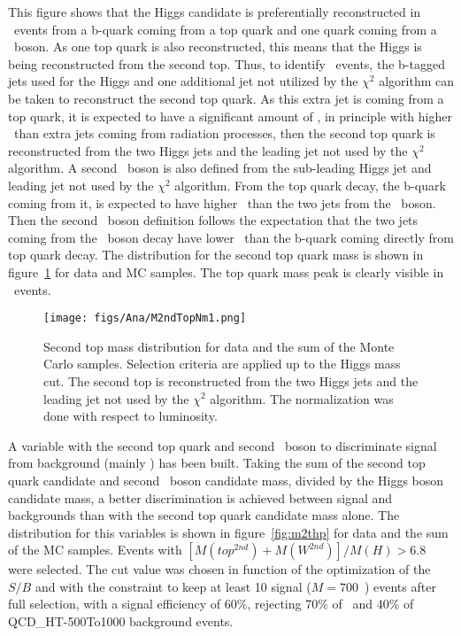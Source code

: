 This figure shows that the Higgs candidate is preferentially reconstructed in \ttbar~events from a b-quark coming from a top quark and one quark coming from a \W~boson. As one top quark is also reconstructed, this means that the Higgs is being reconstructed from the second top. Thus, to identify \ttbar~events, the b-tagged jets used for the Higgs and one additional jet not utilized by the $\chi^{2}$ algorithm can be taken to reconstruct the second top quark. As this extra jet is coming from a top quark, it is expected to have a significant amount of \pt, in principle with higher \pt~than extra jets coming from radiation processes, then the second top quark is reconstructed from the two Higgs jets and the leading jet not used by the $\chi^{2}$ algorithm. A second \W~boson is also defined from the sub-leading Higgs jet and leading jet not used by the $\chi^{2}$ algorithm. From the top quark decay, the b-quark coming from it, is expected to have higher \pt~than the two jets from the \W~boson. Then the second \W~boson definition follows the expectation that the two jets coming from the \W~boson decay have lower \pt~than the b-quark coming directly from top quark decay. The distribution for the second top quark mass is shown in figure~\ref{fig:2ndTM} for data and MC samples. The top quark mass peak is clearly visible in \ttbar~events.

\begin{figure}[!Hhtbp]
  \begin{center}
    \texttt{[image: figs/Ana/M2ndTopNm1.png]}
    \caption{Second top mass distribution for data and the sum of the Monte Carlo samples. Selection criteria are applied up to the Higgs mass cut. The second top is reconstructed from the two Higgs jets and the leading jet not used by the $\chi^{2}$ algorithm. The normalization was done with respect to luminosity.}
    \label{fig:2ndTM}
  \end{center}
\end{figure}

A variable with the second top quark and second \W~boson to discriminate signal from background (mainly \ttbar) has been built. Taking the sum of the second top quark candidate and second \W~boson candidate mass, divided by the Higgs boson candidate mass, a better discrimination is achieved between signal and backgrounds than with the second top quark candidate mass alone. The distribution for this variables is shown in figure~\ref{fig:m2thp} for data and the sum of the MC samples. Events with $\left[M(top^{2nd})+M(W^{2nd})\right]/M(H)>6.8$ were selected. The cut value was chosen in function of the optimization of the $S/B$ and with the constraint to keep at least 10 signal (${M=700}$~\GeVcc) events after full selection, with a signal efficiency of 60\%, rejecting 70\% of \ttbar~and 40\% of QCD\_HT-500To1000 background events.

